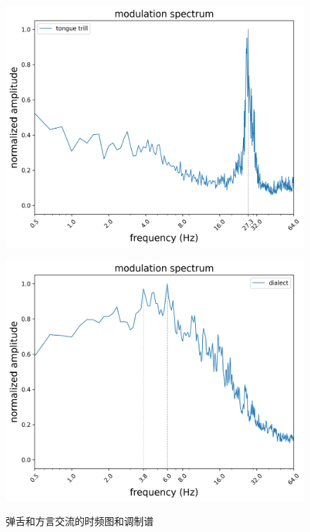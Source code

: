 \documentclass[jou,12pt,floatsintext]{apa7} %
\begin{document}
\begin{figure}[!htb]
    \begin{minipage}{0.49\textwidth}
        \centering
        \subcaption{}
        \vspace{-0.5em}
        \includegraphics[width=\textwidth]{figure/spectrum_tanshe.png}
        \label{spectrum:tanshe}
    \end{minipage}
    \begin{minipage}{0.49\textwidth}
        \centering
        \subcaption{}
        \vspace{-0.5em}
        \includegraphics[width=\textwidth]{figure/spectrum_dialect.png}
        \label{spectrum:dialect}
    \end{minipage}
    
    \captionsetup{labelsep=period}
    \vspace{-1em}
    \caption{\small 弹舌和方言交流的时频图和调制谱}
    
    \label{fig:fig2}
\end{figure}
\end{document}
